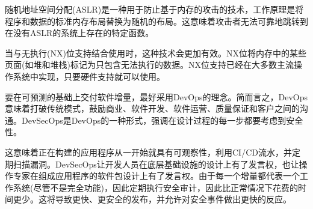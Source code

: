 随机地址空间分配(ASLR)是一种用于防止基于内存的攻击的技术，工作原理是将程序和数据的标准内存布局替换为随机的布局。这意味着攻击者无法可靠地跳转到在没有ASLR的系统上存在的特定函数。

当与无执行(NX)位支持结合使用时，这种技术会更加有效。NX位将内存中的某些页面(如堆和堆栈)标记为只包含无法执行的数据。NX位支持已经在大多数主流操作系统中实现，只要硬件支持就可以使用。


要在可预测的基础上交付软件增量，最好采用DevOps的理念。简而言之，DevOps意味着打破传统模式，鼓励商业、软件开发、软件运营、质量保证和客户之间的沟通。DevSecOps是DevOps的一种形式，强调在设计过程的每一步都要考虑到安全性。

这意味着正在构建的应用程序从一开始就具有可观察性，利用CI/CD流水，并定期扫描漏洞。DevSecOps让开发人员在底层基础设施的设计上有了发言权，也让操作专家在组成应用程序的软件包设计上有了发言权。由于每一个增量都代表一个工作系统(尽管不是完全功能)，因此定期执行安全审计，因此比正常情况下花费的时间更少。这将导致更快、更安全的发布，并允许对安全事件做出更快的反应。









